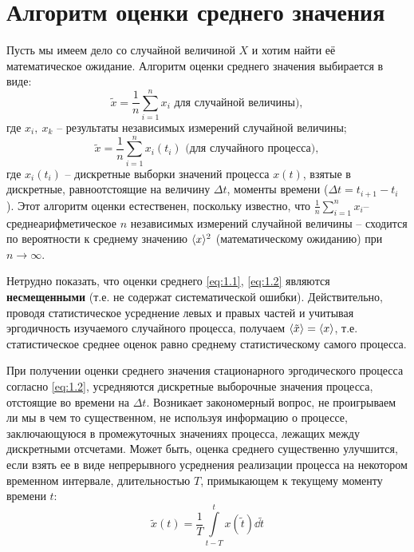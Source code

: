 \section{Алгоритм оценки среднего значения}%
\label{sec:algoritm_otsenki_srednego_znacheniia}
Пусть мы имеем дело со случайной величиной $X$ и хотим найти её математическое ожидание.
Алгоритм оценки среднего значения выбирается в виде:
\begin{equation}
    \label{eq:1.1}
    \tilde x = \frac{1}{n} \sum\limits_{i=1}^{n} x_i \text{ для случайной величины)},
\end{equation}
где $x_i,~x_k$ -- результаты независимых измерений случайной величины;
\begin{equation}
    \label{eq:1.2}
    \tilde x = \frac{1}{n} \sum\limits_{i=1}^{n} x_i(t_i) \text{ (для случайного процесса)},
\end{equation}
где $x_i(t_i)$ -- дискретные выборки значений процесса $x(t)$, взятые в дискретные,
равноотстоящие на величину $\Delta t$, моменты времени ($\Delta t = t_{i+1}-t_i$ ).
Этот алгоритм оценки естественен, поскольку известно, что $\frac{1}{n} \sum\limits_{i=1}^{n} x_i$-- среднеарифметическое $n$ независимых измерений случайной
величины -- сходится по вероятности к среднему значению $\langle x\rangle^2$ (математическому
ожиданию) при $n \to \infty $.

Нетрудно показать, что оценки среднего \eqref{eq:1.1}, \eqref{eq:1.2}  являются
\textbf{несмещенными} (т.е. не содержат систематической ошибки). Действительно, проводя
статистическое усреднение левых и правых частей и учитывая эргодичность изучаемого
случайного процесса, получаем $\langle\tilde x\rangle = \langle x\rangle$, т.е. статистическое среднее оценок равно среднему
статистическому самого процесса.

При получении оценки среднего значения стационарного эргодического процесса согласно 
\eqref{eq:1.2}, усредняются дискретные выборочные значения процесса, отстоящие во времени 
на $\Delta t$. Возникает закономерный вопрос, не проигрываем ли мы в чем то существенном,
не используя информацию о процессе, заключающуюся в промежуточных значениях процесса,
лежащих между дискретными отсчетами. Может быть, оценка среднего существенно улучшится,
если взять ее в виде непрерывного усреднения реализации процесса на некотором временном 
интервале, длительностью $T$, примыкающем к текущему моменту времени $t$:
\begin{equation}
    \label{eq:1.3}
    \tilde x(t) = \frac{1}{T} \int\limits_{t-T}^{t} x(\tilde t) \dd{\tilde t} 
\end{equation}

